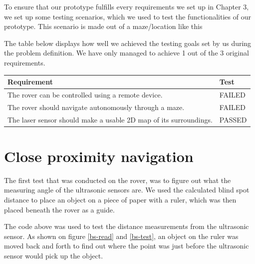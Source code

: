 To ensure that our prototype fulfills every requirements we set up in Chapter 3, we set up some testing scenarios, which we used to test the functionalities of our prototype. This scenario is made out of a maze/location like this

The table below displays how well we achieved the testing goals set by us during the problem definition. We have only managed to achieve 1 out of the 3 original requirements.

\begin{table}[H]
	\centering
	\begin{tabular}{|l|l|}
		\hline
		\textbf{Requirement} & \textbf{Test} \\ \hline
		The rover can be controlled using a remote device. & FAILED \\ \hline
		The rover should navigate autonomously through a maze. & FAILED \\ \hline
		The laser sensor should make a usable 2D map of its surroundings. & PASSED\\ \hline
	\end{tabular}
\end{table}

\clearpage
\section{Close proximity navigation}

The first test that was conducted on the rover, was to figure out what the measuring angle of the ultrasonic sensors are. We used the calculated blind spot distance to place an object on a piece of paper with a ruler, which was then placed beneath the rover as a guide.



The code above was used to test the distance measurements from the ultrasonic sensor. As shown on figure \ref{bs-read} and \ref{bs-test}, an object on the ruler was moved back and forth to find out where the point was just before the ultrasonic sensor would pick up the object.

